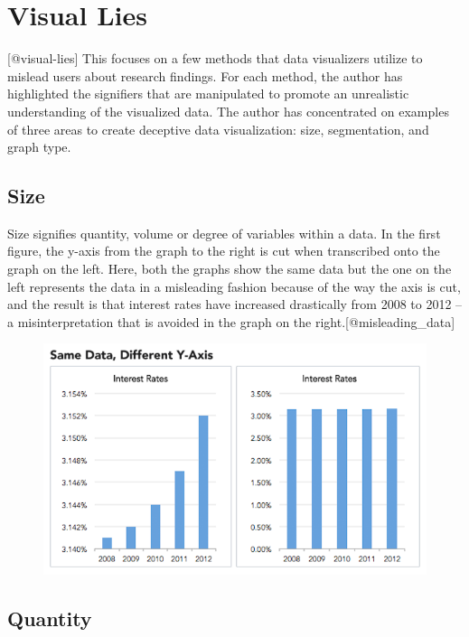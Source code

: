 \documentclass[]{book}
\theoremstyle{definition}
\theoremstyle{definition}
\theoremstyle{definition}
\theoremstyle{remark}
\begin{document}
\section{Visual Lies}\label{visual-lies}

{[}@visual-lies{]} This focuses on a few methods that data visualizers
utilize to mislead users about research findings. For each method, the
author has highlighted the signifiers that are manipulated to promote an
unrealistic understanding of the visualized data. The author has
concentrated on examples of three areas to create deceptive data
visualization: size, segmentation, and graph type.

\subsection{Size}\label{size}

Size signifies quantity, volume or degree of variables within a data. In
the first figure, the y-axis from the graph to the right is cut when
transcribed onto the graph on the left. Here, both the graphs show the
same data but the one on the left represents the data in a misleading
fashion because of the way the axis is cut, and the result is that
interest rates have increased drastically from 2008 to 2012 -- a
misinterpretation that is avoided in the graph on the
right.{[}@misleading\_data{]}

\begin{figure}
\centering
\includegraphics{images/Size1.png}
\caption{}
\end{figure}

\subsection{Quantity}\label{quantity}
\end{document}
